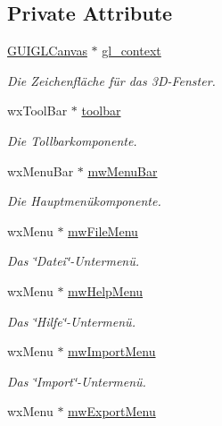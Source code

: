 \subsection*{Private Attribute}
\begin{DoxyCompactItemize}
\item 
\hyperlink{classGUIGLCanvas}{G\-U\-I\-G\-L\-Canvas} $\ast$ \hyperlink{classGUIMainWindow_a7b5069afb8996ff001654f8d832b2bfa}{gl\-\_\-context}
\begin{DoxyCompactList}\small\item\em Die Zeichenfläche für das 3\-D-\/\-Fenster. \end{DoxyCompactList}\item 
wx\-Tool\-Bar $\ast$ \hyperlink{classGUIMainWindow_a8a8638fa87b4080e2242812f3d7e469e}{toolbar}
\begin{DoxyCompactList}\small\item\em Die Tollbarkomponente. \end{DoxyCompactList}\item 
wx\-Menu\-Bar $\ast$ \hyperlink{classGUIMainWindow_a057a6728bf9aa994f41060ebe15a28ac}{mw\-Menu\-Bar}
\begin{DoxyCompactList}\small\item\em Die Hauptmenükomponente. \end{DoxyCompactList}\item 
wx\-Menu $\ast$ \hyperlink{classGUIMainWindow_a3b23fa0fb1d779bd5b8384507d8b90e8}{mw\-File\-Menu}
\begin{DoxyCompactList}\small\item\em Das \char`\"{}\-Datei\char`\"{}-\/\-Untermenü. \end{DoxyCompactList}\item 
wx\-Menu $\ast$ \hyperlink{classGUIMainWindow_ae8fc1a9ba3768aa042a77b5bea117f6c}{mw\-Help\-Menu}
\begin{DoxyCompactList}\small\item\em Das \char`\"{}\-Hilfe\char`\"{}-\/\-Untermenü. \end{DoxyCompactList}\item 
wx\-Menu $\ast$ \hyperlink{classGUIMainWindow_afaff9e1bec11b0f80215ceba76e87bc4}{mw\-Import\-Menu}
\begin{DoxyCompactList}\small\item\em Das \char`\"{}\-Import\char`\"{}-\/\-Untermenü. \end{DoxyCompactList}\item 
wx\-Menu $\ast$ \hyperlink{classGUIMainWindow_a9f6af05ef18bf81ff9955670001941ea}{mw\-Export\-Menu}

\end{DoxyCompactItemize}
